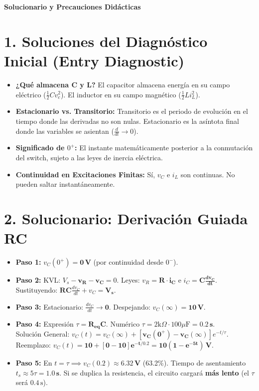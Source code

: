 \documentclass[11pt, a4paper]{article}
\begin{document}
\begin{tcolorbox}[colback=ucbblue!5!white, colframe=ucbblue, title=\textbf{Clave Docente: Introducción a Circuitos Dinámicos (EC3)}]
    \centering \textbf{Solucionario y Precauciones Didácticas}
\end{tcolorbox}

\section*{1. Soluciones del Diagnóstico Inicial (Entry Diagnostic)}
\begin{itemize}
    \item \textbf{¿Qué almacena C y L?} El capacitor almacena energía en su campo eléctrico ($\frac{1}{2}Cv_c^2$). El inductor en su campo magnético ($\frac{1}{2}Li_L^2$).
    \item \textbf{Estacionario vs. Transitorio:} Transitorio es el periodo de evolución en el tiempo donde las derivadas no son nulas. Estacionario es la asíntota final donde las variables se asientan ($\frac{d}{dt} \to 0$).
    \item \textbf{Significado de $0^+$:} El instante matemáticamente posterior a la conmutación del switch, sujeto a las leyes de inercia eléctrica.
    \item \textbf{Continuidad en Excitaciones Finitas:} Sí, $v_C$ e $i_L$ son continuas. No pueden saltar instantáneamente.
\end{itemize}

\section*{2. Solucionario: Derivación Guiada RC}
\begin{itemize}
    \item \textbf{Paso 1:} $v_C(0^+) = \mathbf{0\,\text{V}}$ (por continuidad desde $0^-$).
    \item \textbf{Paso 2:} KVL: $V_s - \mathbf{v_R} - \mathbf{v_C} = 0$. Leyes: $v_R = \mathbf{R \cdot i_C}$ e $i_C = \mathbf{C \frac{dv_C}{dt}}$. \\ Sustituyendo: $\mathbf{RC} \frac{dv_C}{dt} + v_C = \mathbf{V_s}$.
    \item \textbf{Paso 3:} Estacionario: $\frac{dv_C}{dt} \to \mathbf{0}$. Despejando: $v_C(\infty) = \mathbf{10\,\text{V}}$.
    \item \textbf{Paso 4:} Expresión $\tau = \mathbf{R_{eq}C}$. Numérico $\tau = 2\text{k}\Omega \cdot 100\mu\text{F} = \mathbf{0.2\,\text{s}}$. \\ 
    Solución General: $v_C(t) = v_C(\infty) + [\mathbf{v_C(0^+)} - \mathbf{v_C(\infty)}]e^{-t/\tau}$. \\
    Reemplazo: $v_C(t) = \mathbf{10 + [0 - 10]e^{-t/0.2} = 10(1 - e^{-5t})\,\text{V}}$.
    \item \textbf{Paso 5:} En $t=\tau \implies v_C(0.2) \approx \mathbf{6.32\,\text{V}}$ (63.2\%). Tiempo de asentamiento $t_s \approx 5\tau = \mathbf{1.0\,\text{s}}$. Si se duplica la resistencia, el circuito cargará \textbf{más lento} (el $\tau$ será $0.4\,\text{s}$).
\end{itemize}
\end{document}
